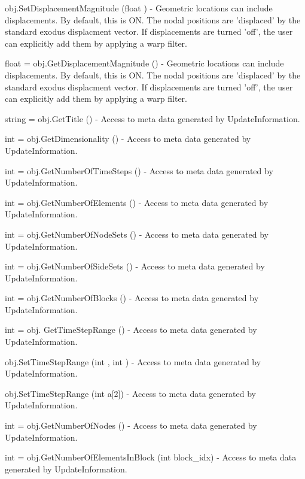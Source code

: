 \begin{DoxyItemize}
\item {\ttfamily obj.\-Set\-Displacement\-Magnitude (float )} -\/ Geometric locations can include displacements. By default, this is O\-N. The nodal positions are 'displaced' by the standard exodus displacment vector. If displacements are turned 'off', the user can explicitly add them by applying a warp filter.  
\item {\ttfamily float = obj.\-Get\-Displacement\-Magnitude ()} -\/ Geometric locations can include displacements. By default, this is O\-N. The nodal positions are 'displaced' by the standard exodus displacment vector. If displacements are turned 'off', the user can explicitly add them by applying a warp filter.  
\item {\ttfamily string = obj.\-Get\-Title ()} -\/ Access to meta data generated by Update\-Information.  
\item {\ttfamily int = obj.\-Get\-Dimensionality ()} -\/ Access to meta data generated by Update\-Information.  
\item {\ttfamily int = obj.\-Get\-Number\-Of\-Time\-Steps ()} -\/ Access to meta data generated by Update\-Information.  
\item {\ttfamily int = obj.\-Get\-Number\-Of\-Elements ()} -\/ Access to meta data generated by Update\-Information.  
\item {\ttfamily int = obj.\-Get\-Number\-Of\-Node\-Sets ()} -\/ Access to meta data generated by Update\-Information.  
\item {\ttfamily int = obj.\-Get\-Number\-Of\-Side\-Sets ()} -\/ Access to meta data generated by Update\-Information.  
\item {\ttfamily int = obj.\-Get\-Number\-Of\-Blocks ()} -\/ Access to meta data generated by Update\-Information.  
\item {\ttfamily int = obj. Get\-Time\-Step\-Range ()} -\/ Access to meta data generated by Update\-Information.  
\item {\ttfamily obj.\-Set\-Time\-Step\-Range (int , int )} -\/ Access to meta data generated by Update\-Information.  
\item {\ttfamily obj.\-Set\-Time\-Step\-Range (int a\mbox{[}2\mbox{]})} -\/ Access to meta data generated by Update\-Information.  
\item {\ttfamily int = obj.\-Get\-Number\-Of\-Nodes ()} -\/ Access to meta data generated by Update\-Information.  
\item {\ttfamily int = obj.\-Get\-Number\-Of\-Elements\-In\-Block (int block\-\_\-idx)} -\/ Access to meta data generated by Update\-Information.  

\end{DoxyItemize}
